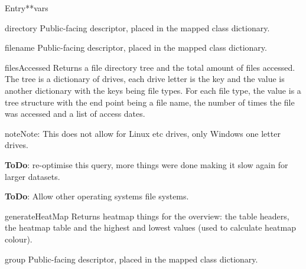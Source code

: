 \documentclass[letterpaper,10pt,english]{manual}
\begin{document}
\begin{classdesc}{Entry}{**vars}
\hypertarget{webscavator.model.models.Entry.directory}{}\begin{memberdesc}{directory}
Public-facing descriptor, placed in the mapped class dictionary.
\end{memberdesc}

\hypertarget{webscavator.model.models.Entry.filename}{}\begin{memberdesc}{filename}
Public-facing descriptor, placed in the mapped class dictionary.
\end{memberdesc}

\hypertarget{webscavator.model.models.Entry.filesAccessed}{}\begin{staticmethoddesc}{filesAccessed}{}
Returns a file directory tree and the total amount of files accessed. The tree
is a dictionary of drives, each drive letter is the key and the value is another dictionary 
with the keys being file types. For each file type, the value is a tree structure with the
end point being a file name, the number of times the file was accessed and a list of 
access dates.

\begin{notice}{note}{Note:}
This does not allow for Linux etc drives, only Windows one letter drives.

\textbf{ToDo}: re-optimise this query, more things were done making it slow again for 
larger datasets.

\textbf{ToDo}: Allow other operating systems file systems.
\end{notice}
\end{staticmethoddesc}

\hypertarget{webscavator.model.models.Entry.generateHeatMap}{}\begin{staticmethoddesc}{generateHeatMap}{}
Returns heatmap things for the overview: the table headers, the heatmap
table and the highest and lowest values (used to calculate heatmap colour).
\end{staticmethoddesc}

\hypertarget{webscavator.model.models.Entry.group}{}\begin{memberdesc}{group}
Public-facing descriptor, placed in the mapped class dictionary.
\end{memberdesc}


\end{classdesc}
\end{document}
